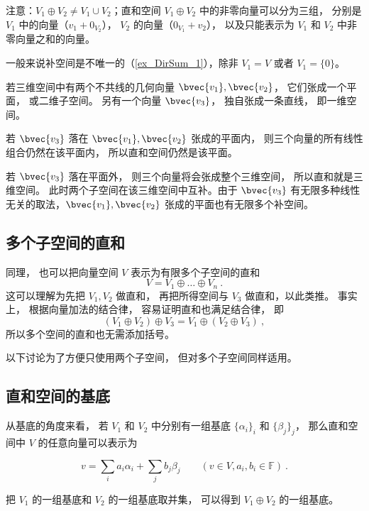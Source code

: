 注意：$V_1 \oplus V_2 \neq V_1 \cup V_2$；直和空间 $V_1 \oplus V_2$ 中的非零向量可以分为三组， 分别是 $V_1$ 中的向量（$v_1 + 0_{V_2}$）， $V_2$ 的向量（$0_{V_1} + v_2$）， 以及只能表示为 $V_1$ 和 $V_2$ 中非零向量之和的向量。

一般来说补空间是不唯一的（\autoref{ex_DirSum_1}），除非 $V_1 = V$ 或者 $V_1 = \{0\}$。

\begin{example}{}\label{ex_DirSum_1}
若三维空间中有两个不共线的几何向量 $\bvec{v_1}, \bvec{v_2}$， 它们张成一个平面， 或二维子空间。 另有一个向量 $\bvec{v_3}$， 独自张成一条直线， 即一维空间。

若 $\bvec{v_3}$ 落在 $\bvec{v_1}, \bvec{v_2}$ 张成的平面内， 则三个向量的所有线性组合仍然在该平面内， 所以直和空间仍然是该平面。

若 $\bvec{v_3}$ 落在平面外， 则三个向量将会张成整个三维空间， 所以直和就是三维空间。 此时两个子空间在该三维空间中互补。由于 $\bvec{v_3}$ 有无限多种线性无关的取法，$\bvec{v_1}, \bvec{v_2}$ 张成的平面也有无限多个补空间。
\end{example}

\subsection{多个子空间的直和}

同理， 也可以把向量空间 $V$ 表示为有限多个子空间的直和
\begin{equation}
V = V_1 \oplus \dots \oplus V_n~.
\end{equation}
这可以理解为先把 $V_1, V_2$ 做直和， 再把所得空间与 $V_3$ 做直和，以此类推。 事实上， 根据向量加法的结合律， 容易证明直和也满足结合律， 即
\begin{equation}
(V_1 \oplus V_2) \oplus V_3 = V_1 \oplus (V_2 \oplus V_3)~,
\end{equation}
所以多个空间的直和也无需添加括号。

以下讨论为了方便只使用两个子空间， 但对多个子空间同样适用。

\subsection{直和空间的基底}

从基底的角度来看， 若 $V_1$ 和 $V_2$ 中分别有一组基底 $\{\alpha_i\}_i$ 和 $\{\beta_j\}_j$， 那么直和空间中 $V$ 的任意向量可以表示为

\begin{equation}\label{eq_DirSum_1}
{v} = \sum_i a_i {\alpha_i} + \sum_j b_j {\beta_j} \qquad (v\in V, a_i, b_i \in \mathbb F)~.
\end{equation}
\begin{theorem}{}\label{the_DirSum_1}
把 $V_1$ 的一组基底和 $V_2$ 的一组基底取并集， 可以得到 $V_1 \oplus V_2$ 的一组基底。
\end{theorem}

